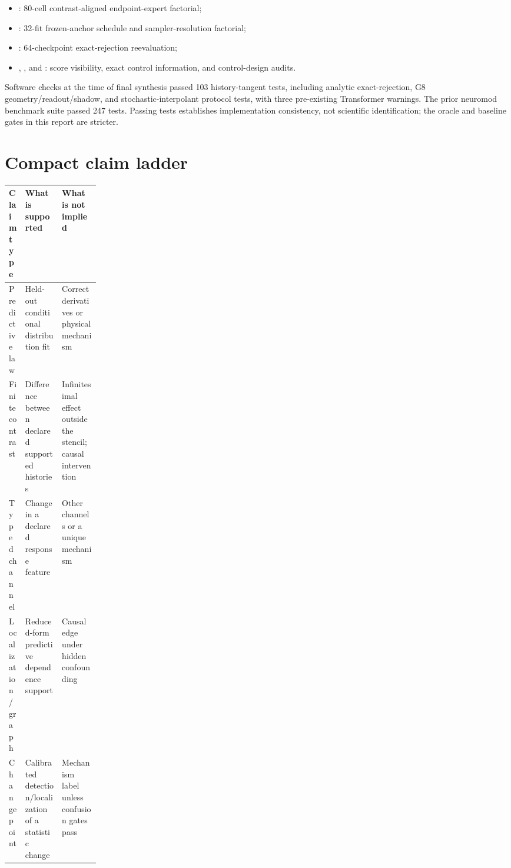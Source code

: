 \documentclass[10pt]{article}
\begin{document}
\begin{itemize}
  \item {}: 80-cell contrast-aligned endpoint-expert factorial;
  \item {}: 32-fit frozen-anchor schedule and sampler-resolution factorial;
  \item {}: 64-checkpoint exact-rejection reevaluation;
  \item {}, , and : score visibility, exact control information, and control-design audits.
\end{itemize}

Software checks at the time of final synthesis passed 103 history-tangent tests,
including analytic exact-rejection, G8 geometry/readout/shadow, and
stochastic-interpolant protocol tests, with three pre-existing Transformer
warnings.  The prior neuromod benchmark suite passed 247 tests. Passing tests
establishes implementation consistency, not scientific identification; the oracle
and baseline gates in this report are stricter.

\section{Compact claim ladder}

\begin{center}
\begin{tabularx}{\linewidth}{@{}p{0.18\linewidth}X X@{}}
\toprule
Claim type & What is supported & What is not implied \\
\midrule
Predictive law & Held-out conditional distribution fit & Correct derivatives or physical mechanism \\
Finite contrast & Difference between declared supported histories & Infinitesimal effect outside the stencil; causal intervention \\
Typed channel & Change in a declared response feature & Other channels or a unique mechanism \\
Localization/graph & Reduced-form predictive dependence support & Causal edge under hidden confounding \\
Changepoint & Calibrated detection/localization of a statistic change & Mechanism label unless confusion gates pass \\
\bottomrule
\end{tabularx}
\end{center}
\end{document}

